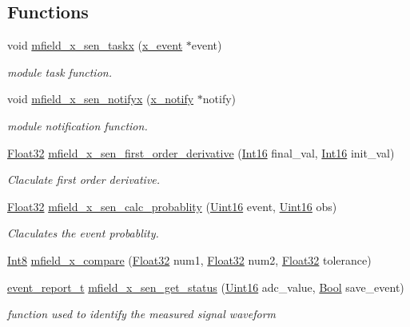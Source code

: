 \subsection*{Functions}
\begin{DoxyCompactItemize}
\item 
void \hyperlink{a00050_a72e9235043dc4a8469143a6eb48bf117}{mfield\+\_\+x\+\_\+sen\+\_\+taskx} (\hyperlink{a00036_de/d37/a00849}{x\+\_\+event} $\ast$event)
\begin{DoxyCompactList}\small\item\em module task function. \end{DoxyCompactList}\item 
void \hyperlink{a00050_ac28a2b5f3fa92c0593446e15a63a501c}{mfield\+\_\+x\+\_\+sen\+\_\+notifyx} (\hyperlink{a00036_df/d4c/a00851}{x\+\_\+notify} $\ast$notify)
\begin{DoxyCompactList}\small\item\em module notification function. \end{DoxyCompactList}\item 
\hyperlink{a00072_a87d38f886e617ced2698fc55afa07637}{Float32} \hyperlink{a00050_a3107eb45e1fcd2dcdfc54498c528a6a5}{mfield\+\_\+x\+\_\+sen\+\_\+first\+\_\+order\+\_\+derivative} (\hyperlink{a00072_a659ce9e5eb6571f9984ffc7caad2660a}{Int16} final\+\_\+val, \hyperlink{a00072_a659ce9e5eb6571f9984ffc7caad2660a}{Int16} init\+\_\+val)
\begin{DoxyCompactList}\small\item\em Claculate first order derivative. \end{DoxyCompactList}\item 
\hyperlink{a00072_a87d38f886e617ced2698fc55afa07637}{Float32} \hyperlink{a00050_a51b6db21b0a9cbb8255cc4cfda81fad8}{mfield\+\_\+x\+\_\+sen\+\_\+calc\+\_\+probablity} (\hyperlink{a00072_a59a9f6be4562c327cbfb4f7e8e18f08b}{Uint16} event, \hyperlink{a00072_a59a9f6be4562c327cbfb4f7e8e18f08b}{Uint16} obs)
\begin{DoxyCompactList}\small\item\em Claculates the event probablity. \end{DoxyCompactList}\item 
\hyperlink{a00072_a7e31ca7716b8d85dd473450a5c5e5a97}{Int8} \hyperlink{a00050_adf290c10214480d55f3631c1760188b0}{mfield\+\_\+x\+\_\+compare} (\hyperlink{a00072_a87d38f886e617ced2698fc55afa07637}{Float32} num1, \hyperlink{a00072_a87d38f886e617ced2698fc55afa07637}{Float32} num2, \hyperlink{a00072_a87d38f886e617ced2698fc55afa07637}{Float32} tolerance)
\item 
\hyperlink{a00021_d6/d66/a00441}{event\+\_\+report\+\_\+t} \hyperlink{a00050_a3a46d0e69b27b3566e6d8465cf7a8b0a}{mfield\+\_\+x\+\_\+sen\+\_\+get\+\_\+status} (\hyperlink{a00072_a59a9f6be4562c327cbfb4f7e8e18f08b}{Uint16} adc\+\_\+value, \hyperlink{a00072_a253b248072cfc8bd812c69acd0046eed}{Bool} save\+\_\+event)
\begin{DoxyCompactList}\small\item\em function used to identify the measured signal waveform \end{DoxyCompactList}\end{DoxyCompactItemize}
